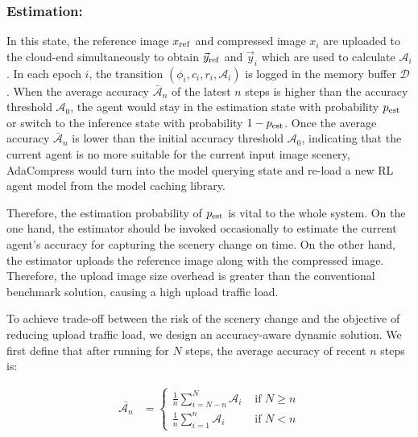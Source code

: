 \subsubsection{Estimation:}

In this state, the reference image $ x_{\rm ref} $ and compressed image $ x_i $ are uploaded to the cloud-end simultaneously to obtain $ \vec{y}_{\rm ref} $ and $ \vec{y}_i $ which are used to calculate $ \mathcal{A}_i $. In each epoch $ i $, the transition $ (\phi_i, c_i, r_i, \mathcal{A}_i) $ is logged in the memory buffer $ \mathcal{D} $. When the average accuracy $ \bar{\mathcal{A}}_n $ of the latest $ n $ steps is higher than the accuracy threshold $ \mathcal{A}_0 $, the agent would stay in the estimation state with probability $ p_{\rm est} $ or switch to the inference state with probability $ 1 - p_{\rm est} $. Once the average accuracy $ \bar{\mathcal{A}}_n $ is lower than the initial accuracy threshold $ \mathcal{A}_0 $, indicating that the current agent is no more suitable for the current input image scenery, AdaCompress would turn into the model querying state and re-load a new RL agent model from the model caching library. %

Therefore, the estimation probability of $ p_{\rm est} $ is vital to the whole system. On the one hand, the estimator should be invoked occasionally to estimate the current agent's accuracy for capturing the scenery change on time. On the other hand, the estimator uploads the reference image along with the compressed image. Therefore, the upload image size overhead is greater than the conventional benchmark solution, causing a high upload traffic load. %

To achieve trade-off between the risk of the scenery change and the objective of reducing upload traffic load, we design an accuracy-aware dynamic solution. We first define that after running for $ N $ steps, the average accuracy of recent $ n $ steps is: 

\begin{align*}
\bar{\mathcal{A}_n} &=
\begin{cases}
\frac{1}{n}\sum_{i=N-n}^{N} \mathcal{A}_i & \text{ if } N \geq n \\ 
\frac{1}{n}\sum_{i=1}^{n} \mathcal{A}_i & \text{ if } N < n 
\end{cases}
\end{align*}

